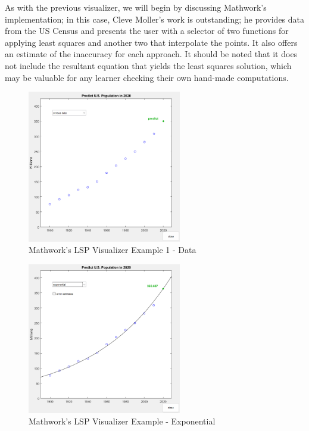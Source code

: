 As with the previous visualizer, we will begin by discussing Mathwork's implementation; in this case, Cleve Moller's work is outstanding; he provides data from the US Census and presents the user with a selector of two functions for applying least squares and another two that interpolate the points. It also offers an estimate of the inaccuracy for each approach. It should be noted that it does not include the resultant equation that yields the least squares solution, which may be valuable for any learner checking their own hand-made computations.

\begin{figure}[H]
    \centering
    \includegraphics[width=0.6\textwidth]{Include/Images/Thesis/Development/Visualizers/LSP/Mathworks.LSP.Ex1.png}
    \caption{Mathwork's LSP Visualizer Example 1 - Data}
    \label{fig:Mathwork's NonLinear Visualizer Example - Data}
\end{figure}
\begin{figure}[H]
    \centering
    \includegraphics[width=0.6\textwidth]{Include/Images/Thesis/Development/Visualizers/LSP/Mathworks.LSP.Ex1.2.png}
    \caption{Mathwork's LSP Visualizer Example - Exponential}
    \label{fig:Mathwork's Least Squares Visualizer Example - Exponential}
\end{figure}
